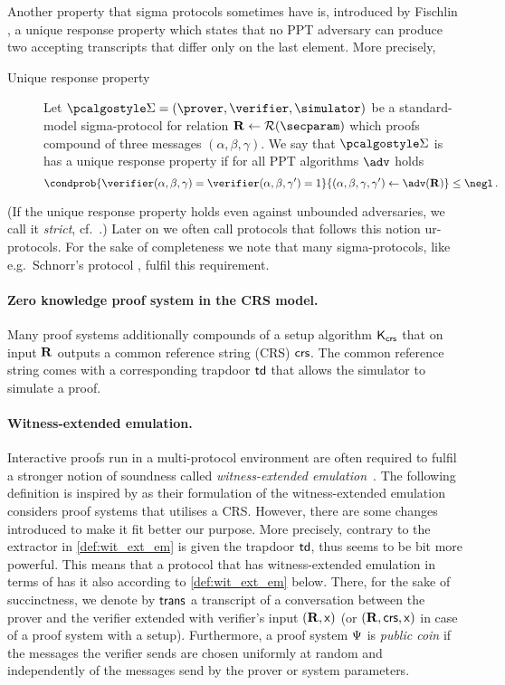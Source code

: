 \documentclass[runningheads,11pt]{llncs}
\theoremstyle{definition}
\begin{document}
Another property that sigma protocols sometimes have is, introduced by Fischlin \cite{C:Fischlin05}, a unique response property which states that no PPT adversary  can produce two accepting transcripts that differ only on the last element.
More precisely,
\begin{description}
	\item[Unique response property] Let $\sigmaprot = (\prover, \verifier, \simulator)$ be a standard-model sigma-protocol for relation $\REL \gets \RELGEN(\secparam)$ which proofs compound of three messages $(\alpha, \beta, \gamma)$. We say that $\sigmaprot$ is has a unique response property if for all PPT algorithms $\adv$ holds
	\[
	\condprob{\verifier (\alpha, \beta, \gamma) = \verifier (\alpha, \beta, \gamma')  = 1}{(\alpha, \beta, \gamma, \gamma') \gets \adv(\REL)} \leq \negl\,.
	\]
\end{description}
(If the unique response property holds even against unbounded adversaries, we call it \emph{strict}, cf.~\cite{INDOCRYPT:FKMV12}.)
Later on we often call protocols that follows this notion ur-protocols.
For the sake of completeness we note that many sigma-protocols, like e.g.~Schnorr's protocol \cite{C:Schnorr89}, fulfil this requirement.

\paragraph{Zero knowledge proof system in the CRS model.}
Many proof systems additionally compounds of a setup algorithm $\mathsf{K}_{\mathsf{crs}}$ that on input $\mathbf{R}$ outputs a common reference string (CRS) $\mathsf{crs}$. The common reference string comes with a corresponding trapdoor $\mathsf{td}$ that allows the simulator to simulate a proof.

\paragraph{Witness-extended emulation.}
Interactive proofs run in a multi-protocol environment are often required to fulfil a stronger notion of soundness called \emph{witness-extended emulation}~\cite{JC:Lindell03}.
The following definition is inspired by  \cite{EC:GroIsh08} as their formulation of the witness-extended emulation considers proof systems that utilises a CRS. However, there are some changes introduced to make it fit better our purpose. More precisely, contrary to \cite{EC:GroIsh08,EC:BCCGP16} the extractor in \cref{def:wit_ext_em} is given the trapdoor $\mathsf{td}$, thus seems to be bit more powerful.
This means that a protocol that has witness-extended emulation in terms of \cite{EC:GroIsh08} has it also according to \cref{def:wit_ext_em} below.
There, for the sake of succinctness, we denote by $\mathsf{trans}$ a transcript of a conversation between the prover and the verifier extended with verifier's input $(\mathbf{R}, \mathsf{x})$ (or $(\mathbf{R}, \mathsf{crs}, \mathsf{x})$ in case of a proof system with a setup).
Furthermore, a proof system $\mathrm{\Psi}$ is \emph{public coin} if the messages the verifier sends are chosen uniformly at random and independently of the messages send by the prover or system parameters.
\end{document}
